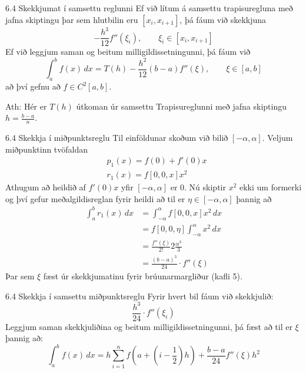 \begin{frame}{6.4 Skekkjumat í samsettu reglunni} 
Ef við lítum á samsettu trapisuregluna með jafna skiptingu þar sem 
hlutbilin eru $[x_i,
x_{i+1}]$, þá fáum við skekkjuna 
\begin{equation*}
  - \frac{h^3}{12}f''(\xi_i), \qquad \xi_i \in [x_i, x_{i+1}]
\end{equation*}
\pause
Ef við leggjum saman og beitum milligildissetningunni, þá fáum við
\begin{equation*}
  \int_a^b f(x)\,dx = T(h) - \frac{h^2}{12}(b-a)f''(\xi), \qquad 
  \xi \in [a,b]
\end{equation*}
að því gefnu að $f\in C^2 [a,b]$.

\smallskip
Ath: Hér er $T(h)$ útkoman úr samsettu Trapisureglunni með 
jafna skiptingu $h = \frac{b-a}n$.
\end{frame}


\begin{frame}{6.4 Skekkja í miðpunktsreglu} 
Til einföldunar skoðum við bilið $[-\alpha,\alpha]$.
Veljum miðpunktinn tvöfaldan
\begin{align*}
  &p_1(x) = f(0) + f'(0)x\\
  &r_1(x) = f[0,0,x]x^2
\end{align*}
Athugum að heildið af $f'(0)x$ yfir $[-\alpha,\alpha]$ er 0. \pause
Nú skiptir $x^2$ ekki um formerki og því gefur meðalgildisreglan 
fyrir heildi að til er $\eta \in [-\alpha,\alpha]$ þannig að
\begin{align*}
  \int_a^b r_1(x)\,dx 
  &= \int_{-\alpha}^{\alpha} f[0,0,x]x^2 \,dx\\
  &= f[0,0,\eta]\int_{-\alpha}^\alpha x^2\,dx\\
  &= \frac{f''(\xi)}{2!}2\frac{\alpha^3}{3}\\
  &= \frac{(b-a)^3}{24}\cdot f''(\xi)
\end{align*}
Þar sem $\xi$ fæst úr skekkjumatinu fyrir brúunarmargliður (kafli 5).
\end{frame}


\begin{frame}{6.4 Skekkja í samsettu miðpunktsreglu}
Fyrir hvert bil fáum við skekkjulið:
\begin{equation*}
  \frac{h^3}{24}\cdot f''(\xi_i)
\end{equation*}
\pause
Leggjum saman skekkjuliðina og beitum milligildissetningunni, þá fæst
að til er $\xi$ þannig að:
\begin{equation*}
  \int_a^b f(x)\,dx = h \sum_{i=1}^n 
  f\left(a+ (i - \frac{1}{2})h\right) + \frac{b-a}{24}f''(\xi)h^2
\end{equation*} 
\end{frame}


